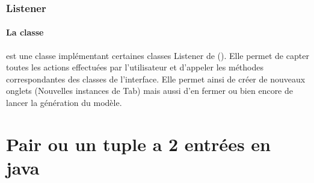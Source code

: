 \subsubsection{Listener}

\paragraph{La classe } est une classe implémentant certaines classes Listener de \Swing (). Elle permet de capter toutes les actions effectuées par l'utilisateur et d'appeler les méthodes correspondantes des classes de l'interface. Elle permet ainsi de créer de nouveaux onglets (Nouvelles instances de Tab) mais aussi d'en fermer ou bien encore de lancer la génération du modèle.
\section{Pair ou un tuple a 2 entrées en java}
